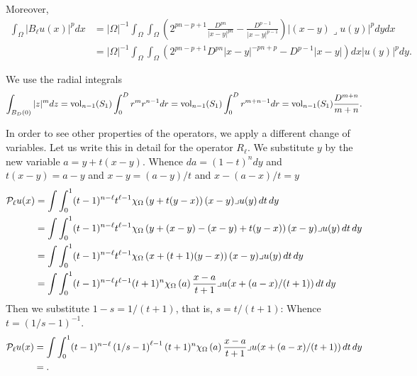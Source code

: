 \documentclass[10pt,a4paper]{article}
\begin{document}
Moreover,  
\begin{align*}
    \int_{\Omega} \left| B_{\ell} u(x) \right|^{p} dx
    &=
    |\Omega|^{-1} 
    \int_{\Omega} 
    \int_{\Omega} 
    \left( 2^{pn-p+1} \frac{D^{pn}}{|x-y|^{pn}} - \frac{D^{p-1}}{|x-y|^{p-1}} \right)
    \left| (x-y)\lrcorner u(y) \right|^{p} 
    dy dx
    \\&=
    |\Omega|^{-1} 
    \int_{\Omega} 
    \int_{\Omega} \left( 2^{pn-p+1} D^{pn} |x-y|^{-pn+p} - D^{p-1} |x-y| \right) dx
    \left| u(y) \right|^{p} 
    dy
    .
\end{align*}






We use the radial integrals
\begin{align*}
    \int_{B_D(0)} |z|^{m} dz
    =
    \operatorname{vol}_{n-1}(S_1) \int_0^D r^{m} r^{n-1} dr
    =
    \operatorname{vol}_{n-1}(S_1) \int_0^D r^{m+n-1} dr
    =
    \operatorname{vol}_{n-1}(S_1) \frac{D^{m+n}}{m+n}
    .
\end{align*}







In order to see other properties of the operators, we apply a different change of variables. 
Let us write this in detail for the operator $R_{\ell}$. 
We substitute $y$ by the new variable $a=y+t(x-y)$.
Whence $da = (1-t)^n dy$ and $t(x-y) = a-y$ and $x-y = (a-y)/t$ and $x - (a-x)/t = y$
\begin{align*}
    {\mathcal P}_{\ell} u(x) 
    &= 
    \int \int_{0}^{1} (t-1)^{n-\ell}t^{\ell-1} 
    \chi_{\Omega}\left(y+t(y-x)\right) 
    (x-y)\lrcorner u(y) \,dt\,dy 
    \\&= 
    \int \int_{0}^{1} (t-1)^{n-\ell}t^{\ell-1} 
    \chi_{\Omega}\left(y+(x-y)-(x-y)+t(y-x)\right) 
    (x-y)\lrcorner u(y) \,dt\,dy 
    \\&= 
    \int \int_{0}^{1} (t-1)^{n-\ell}t^{\ell-1} 
    \chi_{\Omega}\left(x+(t+1)(y-x)\right) 
    (x-y)\lrcorner u(y) \,dt\,dy 
    \\
    &= 
    \int \int_{0}^{1} (t-1)^{n-\ell}t^{\ell-1} (t+1)^{n}
    \chi_{\Omega}\left(a\right) 
    \frac{ x-a }{t+1}\lrcorner u( x + (a-x)/(t+1) ) \,dt\,dy 
\end{align*}
Then we substitute $1-s = 1/(t+1)$, that is, $s = t/(t+1)$:
Whence $t = \left( 1/s-1 \right)^{-1}$.
\begin{align*}
    {\mathcal P}_{\ell} u(x) 
    &= 
    \int \int_{0}^{1} (t-1)^{n-\ell} \left( 1/s-1 \right)^{\ell-1} (t+1)^{n}
    \chi_{\Omega}\left(a\right) 
    \frac{ x-a }{t+1}\lrcorner u( x + (a-x)/(t+1) ) \,dt\,dy 
    \\
    &= 
    .
\end{align*}
\end{document}
